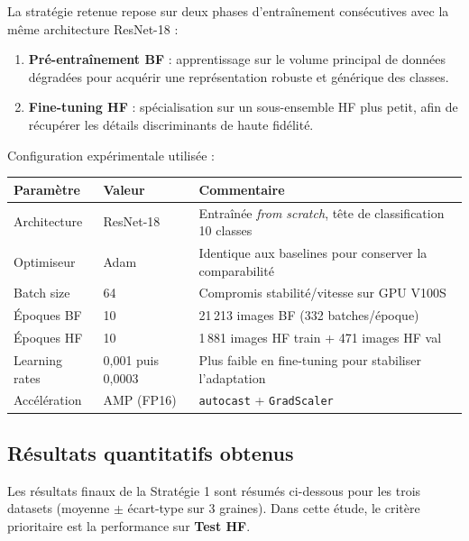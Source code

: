 \documentclass[11pt,a4paper,openany]{book}
\newcommand{\tableheadcolor}{\rowcolor{headerbg}}
\begin{document}
La stratégie retenue repose sur deux phases d'entraînement consécutives avec la même architecture ResNet-18 :

\begin{enumerate}
  \item \textbf{Pré-entraînement BF} : apprentissage sur le volume principal de données dégradées pour acquérir une représentation robuste et générique des classes.
  \item \textbf{Fine-tuning HF} : spécialisation sur un sous-ensemble HF plus petit, afin de récupérer les détails discriminants de haute fidélité.
\end{enumerate}

Configuration expérimentale utilisée :

\vspace{0.6em}
\renewcommand{\arraystretch}{1.45}
\begin{tabularx}{\linewidth}{L{4.1cm} C{3cm} L{7.6cm}}
  \toprule
  \tableheadcolor
  \textbf{Paramètre} & \textbf{Valeur} & \textbf{Commentaire} \\
  \midrule
  Architecture & ResNet-18 & Entraînée \textit{from scratch}, tête de classification 10 classes \\
  Optimiseur & Adam & Identique aux baselines pour conserver la comparabilité \\
  Batch size & 64 & Compromis stabilité/vitesse sur GPU V100S \\
  Époques BF & 10 & 21\,213 images BF (332 batches/époque) \\
  Époques HF & 10 & 1\,881 images HF train + 471 images HF val \\
  Learning rates & 0,001 puis 0,0003 & Plus faible en fine-tuning pour stabiliser l'adaptation \\
  Accélération & AMP (FP16) & \texttt{autocast} + \texttt{GradScaler} \\
  \bottomrule
\end{tabularx}

\subsection{Résultats quantitatifs obtenus}

Les résultats finaux de la Stratégie 1 sont résumés ci-dessous pour les trois datasets (moyenne $\pm$ écart-type sur 3 graines).
Dans cette étude, le critère prioritaire est la performance sur \textbf{Test HF}.
\end{document}
